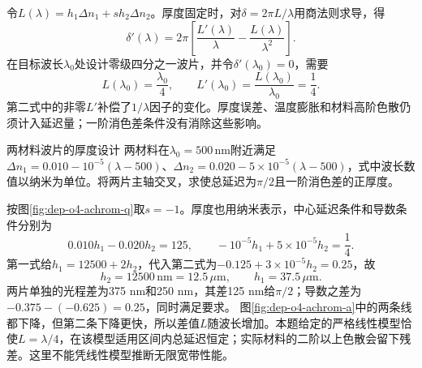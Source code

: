 令$L(\lambda)=h_1\Delta n_1+s h_2\Delta n_2$。厚度固定时，对$\delta=2\pi L/\lambda$用商法则求导，得
\[
 \delta'(\lambda)=2\pi\left[\frac{L'(\lambda)}{\lambda}-\frac{L(\lambda)}{\lambda^2}\right].
\]
在目标波长$\lambda_0$处设计零级四分之一波片，并令$\delta'(\lambda_0)=0$，需要
\[
 L(\lambda_0)=\frac{\lambda_0}{4},\qquad
 L'(\lambda_0)=\frac{L(\lambda_0)}{\lambda_0}=\frac14.
\]
第二式中的非零$L'$补偿了$1/\lambda$因子的变化。厚度误差、温度膨胀和材料高阶色散仍须计入延迟量；一阶消色差条件没有消除这些影响。

\begin{example}两材料波片的厚度设计
两材料在$\lambda_0=500\,\mathrm{nm}$附近满足$\Delta n_1=0.010-10^{-5}(\lambda-500)$、$\Delta n_2=0.020-5\times10^{-5}(\lambda-500)$，式中波长数值以纳米为单位。将两片主轴交叉，求使总延迟为$\pi/2$且一阶消色差的正厚度。
\end{example}
\begin{solution}
按图\ref{fig:dep-o4-achrom-q}取$s=-1$。厚度也用纳米表示，中心延迟条件和导数条件分别为
\[
 0.010h_1-0.020h_2=125,
 \qquad -10^{-5}h_1+5\times10^{-5}h_2=\frac14.
\]
第一式给$h_1=12500+2h_2$，代入第二式为$-0.125+3\times10^{-5}h_2=0.25$，故
\[
 h_2=12500\,\mathrm{nm}=12.5\,\mu\mathrm m,
 \qquad h_1=37.5\,\mu\mathrm m.
\]
两片单独的光程差为375 nm和250 nm，其差125 nm给$\pi/2$；导数之差为$-0.375-(-0.625)=0.25$，同时满足要求。
图\ref{fig:dep-o4-achrom-a}中的两条线都下降，但第二条下降更快，所以差值$L$随波长增加。本题给定的严格线性模型恰使$L=\lambda/4$，在该模型适用区间内总延迟恒定；实际材料的二阶以上色散会留下残差。这里不能凭线性模型推断无限宽带性能。
\end{solution}
